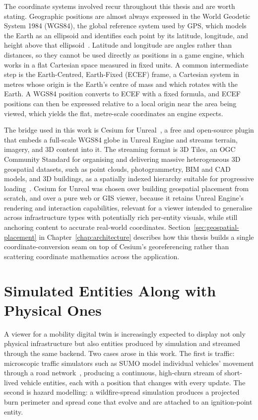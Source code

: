 The coordinate systems involved recur throughout this thesis and are worth stating. Geographic positions are almost always expressed in the World Geodetic System 1984 (WGS84), the global reference system used by GPS, which models the Earth as an ellipsoid and identifies each point by its latitude, longitude, and height above that ellipsoid~\cite{nima2000wgs84}. Latitude and longitude are angles rather than distances, so they cannot be used directly as positions in a game engine, which works in a flat Cartesian space measured in fixed units. A common intermediate step is the Earth-Centred, Earth-Fixed (ECEF) frame, a Cartesian system in metres whose origin is the Earth's centre of mass and which rotates with the Earth. A WGS84 position converts to ECEF with a fixed formula, and ECEF positions can then be expressed relative to a local origin near the area being viewed, which yields the flat, metre-scale coordinates an engine expects.

The bridge used in this work is Cesium for Unreal~\cite{cesiumforunreal}, a free and open-source plugin that embeds a full-scale WGS84 globe in Unreal Engine and streams terrain, imagery, and 3D content into it. The streaming format is 3D Tiles, an OGC Community Standard for organising and delivering massive heterogeneous 3D geospatial datasets, such as point clouds, photogrammetry, BIM and CAD models, and 3D buildings, as a spatially indexed hierarchy suitable for progressive loading~\cite{ogc3dtiles}. Cesium for Unreal was chosen over building geospatial placement from scratch, and over a pure web or GIS viewer, because it retains Unreal Engine's rendering and interaction capabilities, relevant for a viewer intended to generalise across infrastructure types with potentially rich per-entity visuals, while still anchoring content to accurate real-world coordinates. Section~\ref{sec:geospatial-placement} in Chapter~\ref{chap:architecture} describes how this thesis builds a single coordinate-conversion seam on top of Cesium's georeferencing rather than scattering coordinate mathematics across the application.

\section{Simulated Entities Along with Physical Ones}
\label{sec:simulated-entities}

A viewer for a mobility digital twin is increasingly expected to display not only physical infrastructure but also entities produced by simulation and streamed through the same backend. Two cases arose in this work. The first is traffic: microscopic traffic simulators such as SUMO model individual vehicles' movement through a road network~\cite{lopez2018sumo}, producing a continuous, high-churn stream of short-lived vehicle entities, each with a position that changes with every update. The second is hazard modelling: a wildfire-spread simulation produces a projected burn perimeter and spread cone that evolve and are attached to an ignition-point entity.

